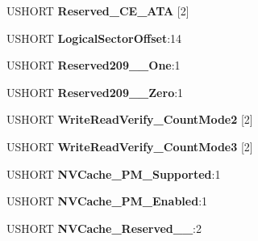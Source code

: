 \begin{DoxyCompactItemize}
\begin{tabbing}
\end{tabbing}\item 
\mbox{\label{struct___i_d_e_n_t_i_f_y___d_a_t_a_a221725678928feaaf400d232508ab13a}} 
U\+S\+H\+O\+RT {\bfseries Reserved\+\_\+\+C\+E\+\_\+\+A\+TA} \mbox{[}2\mbox{]}
\item 
\mbox{\label{struct___i_d_e_n_t_i_f_y___d_a_t_a_aebc14e04f38f418806e71ccc8703c213}} 
U\+S\+H\+O\+RT {\bfseries Logical\+Sector\+Offset}\+:14
\item 
\mbox{\label{struct___i_d_e_n_t_i_f_y___d_a_t_a_a25e29865a2782762a7f51790de9309d6}} 
U\+S\+H\+O\+RT {\bfseries Reserved209\+\_\+\_\+\+One}\+:1
\item 
\mbox{\label{struct___i_d_e_n_t_i_f_y___d_a_t_a_ab0e9a1084cd36954ba3bcea6e311360e}} 
U\+S\+H\+O\+RT {\bfseries Reserved209\+\_\+\_\+\+Zero}\+:1
\item 
\mbox{\label{struct___i_d_e_n_t_i_f_y___d_a_t_a_ad79d54b74a4d3123a702ca3881e9f81c}} 
U\+S\+H\+O\+RT {\bfseries Write\+Read\+Verify\+\_\+\+Count\+Mode2} \mbox{[}2\mbox{]}
\item 
\mbox{\label{struct___i_d_e_n_t_i_f_y___d_a_t_a_acfa69d41356c424b8ef6aa957fc805d9}} 
U\+S\+H\+O\+RT {\bfseries Write\+Read\+Verify\+\_\+\+Count\+Mode3} \mbox{[}2\mbox{]}
\item 
\mbox{\label{struct___i_d_e_n_t_i_f_y___d_a_t_a_ac3120629d51237780e990acaf61352c0}} 
U\+S\+H\+O\+RT {\bfseries N\+V\+Cache\+\_\+\+P\+M\+\_\+\+Supported}\+:1
\item 
\mbox{\label{struct___i_d_e_n_t_i_f_y___d_a_t_a_a01d6030c277e66a56b772576fa0e7f65}} 
U\+S\+H\+O\+RT {\bfseries N\+V\+Cache\+\_\+\+P\+M\+\_\+\+Enabled}\+:1
\item 
\mbox{\label{struct___i_d_e_n_t_i_f_y___d_a_t_a_af132827147c6b8dc79087220c0768a34}} 
U\+S\+H\+O\+RT {\bfseries N\+V\+Cache\+\_\+\+Reserved\+\_\+\_}\+:2

\end{DoxyCompactItemize}
